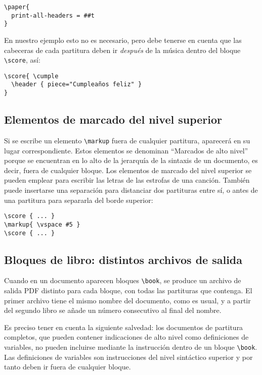 \begin{verbatim}
\paper{
  print-all-headers = ##t
}
\end{verbatim}

En nuestro ejemplo esto no es necesario, pero debe tenerse en cuenta
que las cabeceras de cada partitura deben ir \emph{después} de la
música dentro del bloque \verb+\score+, así:

\begin{verbatim}
\score{ \cumple
  \header { piece="Cumpleaños feliz" }
}
\end{verbatim}


\subsection{Elementos de marcado del nivel superior}

Si se escribe un elemento \verb+\markup+ fuera de cualquier partitura,
aparecerá en su lugar correspondiente.  Estos elementos se denominan
``Marcados de alto nivel'' porque se encuentran en lo alto de la
jerarquía de la sintaxis de un documento, es decir, fuera de cualquier
bloque.  Los elementos de marcado del nivel superior se pueden emplear
para escribir las letras de las estrofas de una canción.  También
puede insertarse una separación para distanciar dos partituras entre
sí, o antes de una partitura para separarla del borde superior:

\begin{verbatim}
\score { ... }
\markup{ \vspace #5 }
\score { ... }
\end{verbatim}


\subsection{Bloques de libro: distintos archivos de salida}

Cuando en un documento aparecen bloques \verb+\book+, se produce un
archivo de salida PDF distinto para cada bloque, con todas las
partituras que contenga.  El primer archivo tiene el mismo nombre del
documento, como es usual, y a partir del segundo libro se añade un
número consecutivo al final del nombre.

Es preciso tener en cuenta la siguiente salvedad: los documentos de
partitura completos, que pueden contener indicaciones de alto nivel
como definiciones de variables, no pueden incluirse mediante la
instrucción \verb++ dentro de un bloque \verb+\book+.  Las
definiciones de variables son instrucciones del nivel sintáctico
superior y por tanto deben ir fuera de cualquier bloque.

